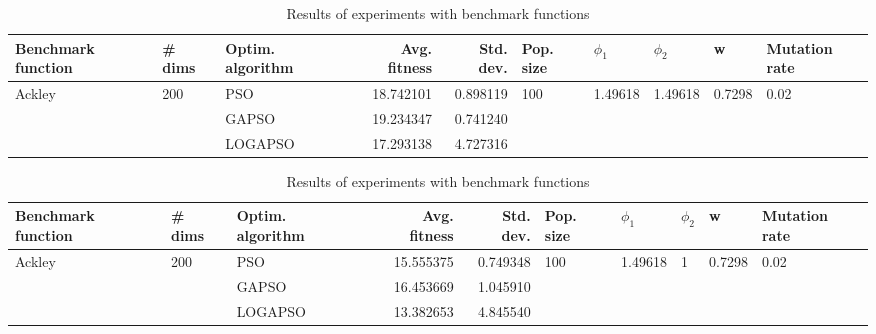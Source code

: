 \documentclass{article}
\begin{document}
\begin{table}
\centering
\caption{Results of experiments with benchmark functions}
\begin{tabular}{lllrrlllll}
\toprule
     Benchmark function &              \# dims & Optim. algorithm &  Avg. fitness &  Std. dev. &            Pop. size &               $\phi_{1}$ &               $\phi_{2}$ &                       w &         Mutation rate \\
\midrule
\multirow{3}{*}{Ackley} & \multirow{3}{*}{200} &              PSO &     18.742101 &   0.898119 & \multirow{3}{*}{100} & \multirow{3}{*}{1.49618} & \multirow{3}{*}{1.49618} & \multirow{3}{*}{0.7298} & \multirow{3}{*}{0.02} \\
                        &                      &            GAPSO &     19.234347 &   0.741240 &                      &                          &                          &                         &                       \\
                        &                      &          LOGAPSO &     17.293138 &   4.727316 &                      &                          &                          &                         &                       \\
\bottomrule
\end{tabular}
\end{table}
\begin{table}
\centering
\caption{Results of experiments with benchmark functions}
\begin{tabular}{lllrrlllll}
\toprule
     Benchmark function &              \# dims & Optim. algorithm &  Avg. fitness &  Std. dev. &            Pop. size &               $\phi_{1}$ &         $\phi_{2}$ &                       w &         Mutation rate \\
\midrule
\multirow{3}{*}{Ackley} & \multirow{3}{*}{200} &              PSO &     15.555375 &   0.749348 & \multirow{3}{*}{100} & \multirow{3}{*}{1.49618} & \multirow{3}{*}{1} & \multirow{3}{*}{0.7298} & \multirow{3}{*}{0.02} \\
                        &                      &            GAPSO &     16.453669 &   1.045910 &                      &                          &                    &                         &                       \\
                        &                      &          LOGAPSO &     13.382653 &   4.845540 &                      &                          &                    &                         &                       \\
\bottomrule
\end{tabular}
\end{table}
\end{document}
